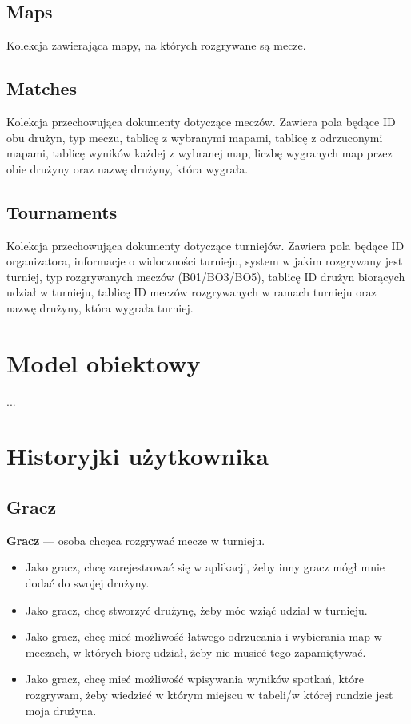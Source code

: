 \documentclass[shortabstract]{iithesis}
\theoremstyle{definition} \newtheorem{definition}{Definicja}[]
\theoremstyle{remark} \newtheorem{remark}[definition]{Observation}
\theoremstyle{plain} \newtheorem{theorem}[definition]{Theorem}
\theoremstyle{plain} \newtheorem{lemma}[definition]{Lemma}
\begin{document}
\subsection{Maps}
Kolekcja zawierająca mapy, na których rozgrywane są mecze.

\subsection{Matches}
Kolekcja przechowująca dokumenty dotyczące meczów. Zawiera pola będące ID obu drużyn, typ meczu, tablicę z wybranymi mapami, tablicę z odrzuconymi mapami, tablicę wyników każdej z wybranej map, liczbę wygranych map przez obie drużyny oraz nazwę drużyny, która wygrała.

\subsection{Tournaments}
Kolekcja przechowująca dokumenty dotyczące turniejów. Zawiera pola będące ID organizatora, informacje o widoczności turnieju, system w jakim rozgrywany jest turniej, typ rozgrywanych meczów (B01/BO3/BO5), tablicę ID drużyn biorących udział w turnieju, tablicę ID meczów rozgrywanych w ramach turnieju oraz nazwę drużyny, która wygrała turniej.

\section{Model obiektowy} %
...

\section{Historyjki użytkownika}

\subsection{Gracz}
\textbf{Gracz} --- osoba chcąca rozgrywać mecze w turnieju.
\begin{itemize}
    \item Jako gracz, chcę zarejestrować się w aplikacji, żeby inny gracz mógł mnie dodać do swojej drużyny.
    \item Jako gracz, chcę stworzyć drużynę, żeby móc wziąć udział w turnieju.
    \item Jako gracz, chcę mieć możliwość łatwego odrzucania i wybierania map w meczach, w których biorę udział, żeby nie musieć tego zapamiętywać.
    \item Jako gracz, chcę mieć możliwość wpisywania wyników spotkań, które rozgrywam, żeby wiedzieć w którym miejscu w tabeli/w której rundzie jest moja drużyna.
\end{itemize}
\end{document}
